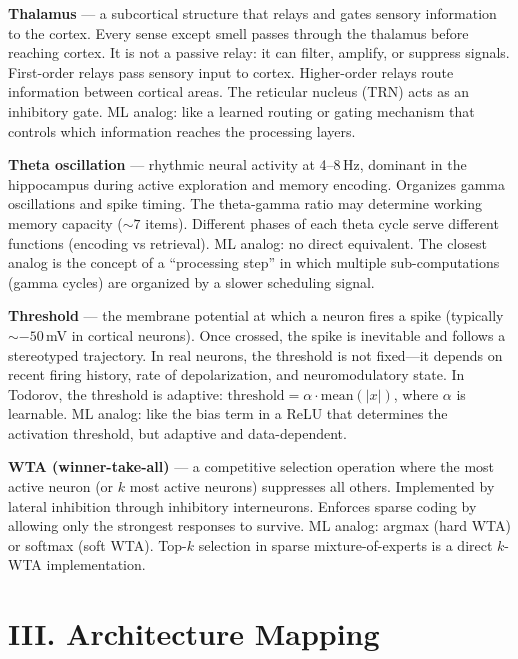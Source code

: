 \documentclass[11pt,a4paper]{article}
\begin{document}
\textbf{Thalamus} --- a subcortical structure that relays and gates sensory information to the cortex. Every sense except smell passes through the thalamus before reaching cortex. It is not a passive relay: it can filter, amplify, or suppress signals. First-order relays pass sensory input to cortex. Higher-order relays route information between cortical areas. The reticular nucleus (TRN) acts as an inhibitory gate. ML analog: like a learned routing or gating mechanism that controls which information reaches the processing layers.

\textbf{Theta oscillation} --- rhythmic neural activity at 4--8\,Hz, dominant in the hippocampus during active exploration and memory encoding. Organizes gamma oscillations and spike timing. The theta-gamma ratio may determine working memory capacity (${\sim}7$ items). Different phases of each theta cycle serve different functions (encoding vs retrieval). ML analog: no direct equivalent. The closest analog is the concept of a ``processing step'' in which multiple sub-computations (gamma cycles) are organized by a slower scheduling signal.

\textbf{Threshold} --- the membrane potential at which a neuron fires a spike (typically ${\sim}{-50}$\,mV in cortical neurons). Once crossed, the spike is inevitable and follows a stereotyped trajectory. In real neurons, the threshold is not fixed---it depends on recent firing history, rate of depolarization, and neuromodulatory state. In Todorov, the threshold is adaptive: $\mathrm{threshold} = \alpha \cdot \mathrm{mean}(|x|)$, where $\alpha$ is learnable. ML analog: like the bias term in a ReLU that determines the activation threshold, but adaptive and data-dependent.

\textbf{WTA (winner-take-all)} --- a competitive selection operation where the most active neuron (or $k$ most active neurons) suppresses all others. Implemented by lateral inhibition through inhibitory interneurons. Enforces sparse coding by allowing only the strongest responses to survive. ML analog: argmax (hard WTA) or softmax (soft WTA). Top-$k$ selection in sparse mixture-of-experts is a direct $k$-WTA implementation.

\newpage


\section{III. Architecture Mapping}
\end{document}

